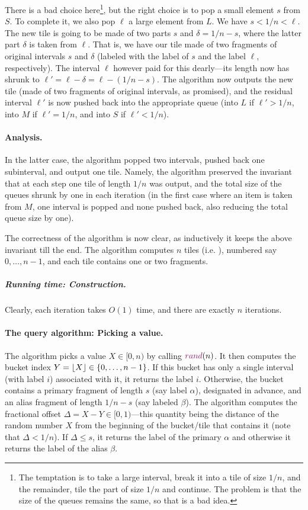 There is a bad choice here\footnote{%
   The temptation is to take a large interval, break it into a tile of
   size $1/n$, and the remainder, tile the part of size $1/n$ and
   continue. The problem is that the size of the queues remains the same,
   so that is a bad idea.}, but the right choice is to pop a small
element $s$ from $S$. To complete it, we also pop $\ell$ a large element
from $L$. We have $s < 1/n < \ell$. The new tile is going to be made of two
parts $s$ and $\delta =1/n-s$, where the latter part $\delta$ is taken from
$\ell$. That is, we have our tile made of two fragments of original
intervals $s$ and $\delta$ (labeled with the label of $s$ and the label
$\ell$, respectively). The interval $\ell$ however paid for this dearly---its
length now has shrunk to $\ell' = \ell - \delta = \ell - (1/n - s)$. The algorithm now
outputs the new tile (made of two fragments of original intervals, as
promised), and the residual interval $\ell'$ is now pushed back into the
appropriate queue (into $L$ if $\ell' > 1/n$, into $M$ if $\ell' = 1/n$, and
into $S$ if $\ell' < 1/n$).

\paragraph*{Analysis.}    
In the latter case, the algorithm popped two intervals, pushed back one
subinterval, and output one tile. Namely, the algorithm preserved the
invariant that at each step one tile of length $1/n$ was output, and the
total size of the queues shrunk by one in each iteration (in the first
case where an item is taken from $M$, one interval is popped and none
pushed back, also reducing the total queue size by one).

The correctness of the algorithm is now clear, as inductively it keeps
the above invariant till the end. The algorithm computes $n$ tiles
(i.e. ), numbered say $0, \ldots, n-1$, and each tile contains
one or two fragments.

\subparagraph*{Running time: Construction.} Clearly, each iteration takes
$O(1)$ time, and there are exactly $n$ iterations.

\paragraph*{The query algorithm: Picking a value.}
The algorithm picks a value $X \in [0,n)$ by calling
$\AlgorithmI{rand}(n)$. It then computes the bucket index
$Y = \left\lfloor {X} \right\rfloor \in \{0, \ldots, n-1\}$. If this bucket has only a single
interval (with label $i$) associated with it, it returns the label
$i$. Otherwise, the bucket contains a primary fragment of length $s$ (say
label $\alpha$), designated in advance, and an alias fragment of length
$1/n - s$ (say labeled $\beta$). The algorithm computes the fractional offset
$\Delta = X - Y \in [0,1)$---this quantity being the distance of the random number
$X$ from the beginning of the bucket/tile that contains it (note that
$\Delta < 1/n$).  If $\Delta \leq s$, it returns the label of the primary
$\alpha$ and otherwise it returns the label of the alias $\beta$.

